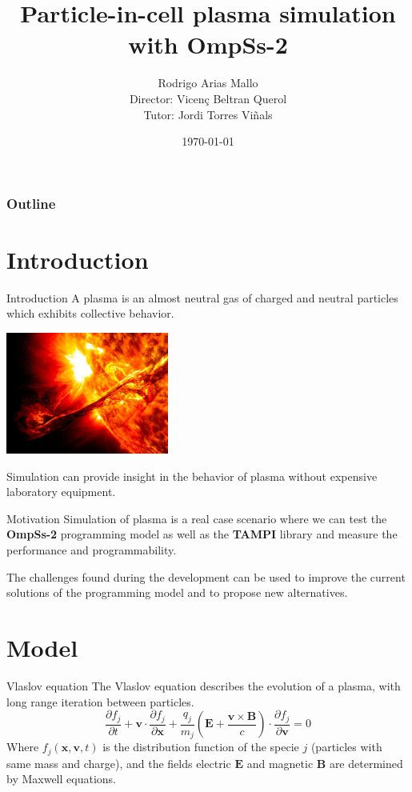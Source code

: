 \documentclass{beamer}
\title{Particle-in-cell plasma simulation\\with OmpSs-2}
\author{Rodrigo Arias Mallo\\
\vspace{1em}
{\footnotesize Director: Vicenç Beltran Querol \\
Tutor: Jordi Torres Viñals}}
\institute{Universitat Politècnica de Catalunya (UPC)}
\date{\today}
\newcommand*\V[1]{\bm{#1}}
\newcommand{\E}{\V{E}}
\newcommand{\B}{\V{B}}
\renewcommand*{\v}{\V{v}}
\newcommand{\x}{\V{x}}
\begin{document}
\frame{\titlepage}

\begin{frame}
\frametitle{Outline}
\tableofcontents
\end{frame}

\section{Introduction}

\begin{frame}{Introduction}
A plasma is an almost neutral gas of charged and neutral particles which 
exhibits collective behavior.

\begin{center}
\includegraphics[width=0.4\textwidth]{plasma.jpg}
\end{center}

Simulation can provide insight in the behavior of plasma without expensive 
laboratory equipment.
\end{frame}

\begin{frame}{Motivation}
Simulation of plasma is a real case scenario where we can test the 
\textbf{OmpSs-2} programming model as well as the \textbf{TAMPI} library and 
measure the performance and programmability.

\vspace{1em}
The challenges found during the development can be used to improve the current 
solutions of the programming model and to propose new alternatives.
\end{frame}




\section{Model}

\begin{frame}{Vlaslov equation}
The Vlaslov equation describes the evolution of a plasma, with long range 
iteration between particles.
\begin{equation}%
\frac {\partial f_j}{\partial t} +
\v \cdot \frac {\partial f_j}{\partial \V x } +
\frac{q_j}{m_j} \left( \E + \frac{\v \times \B}{c} \right) \cdot
	\frac {\partial f_j}{\partial \V v}
=0
\end{equation}%
Where $f_j(\x,\v,t)$ is the distribution function of the specie $j$ (particles 
with same mass and charge), and the fields electric $\E$ and magnetic $\B$ are 
determined by Maxwell equations.
\end{frame}
\end{document}
